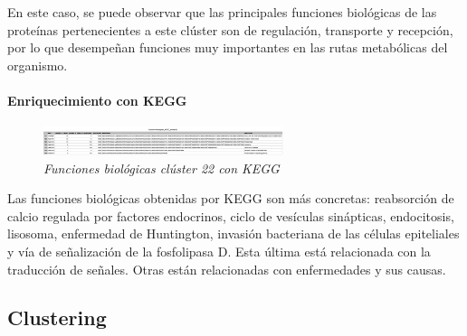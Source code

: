 En este caso, se puede observar que las principales funciones biológicas de las proteínas pertenecientes a este clúster son de regulación, transporte y recepción, por lo que desempeñan funciones muy importantes en las rutas metabólicas del organismo. 

\paragraph{Enriquecimiento con KEGG}

\begin{figure}[h]
	\centering
	\includegraphics[width=70mm,scale=1.2]{figures/cluster22_KEGG.png}
	\caption{\textit{Funciones biológicas clúster 22 con KEGG}}
\end{figure}

Las funciones biológicas obtenidas por KEGG son más concretas: reabsorción de calcio regulada por factores endocrinos, ciclo de vesículas sinápticas, endocitosis, lisosoma, enfermedad de Huntington, invasión bacteriana de las células epiteliales y vía de señalización de la fosfolipasa D. Esta última está relacionada con la traducción de señales. Otras están relacionadas con enfermedades y sus causas.

\subsection{Clustering}


